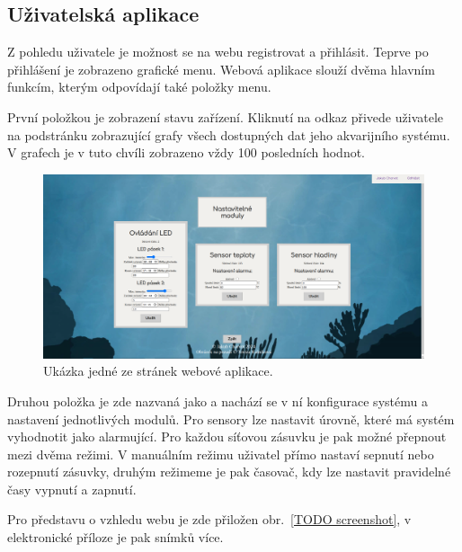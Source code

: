     \subsection{Uživatelská aplikace}
        Z pohledu uživatele je možnost se na webu registrovat a přihlásit. Teprve po přihlášení je zobrazeno grafické menu. Webová aplikace slouží dvěma hlavním funkcím, kterým odpovídají také položky menu. 
        
        První položkou je zobrazení stavu zařízení. Kliknutí na odkaz přivede uživatele na podstránku zobrazující grafy všech dostupných dat jeho akvarijního systému. V grafech je v tuto chvíli zobrazeno vždy 100 posledních hodnot. 

        \begin{figure}[h!]
            \centering
            \includegraphics[width=\textwidth]{obrazky/web.png}
            \caption{Ukázka jedné ze stránek webové aplikace.}
            \label{fig:obrazky-web.png}
        \end{figure}
        

        Druhou položka je zde nazvaná jako  a nachází se v ní konfigurace systému a nastavení jednotlivých modulů. Pro sensory lze nastavit úrovně, které má systém vyhodnotit jako alarmující. Pro každou síťovou zásuvku je pak možné přepnout mezi dvěma režimi. V manuálním režimu uživatel přímo nastaví sepnutí nebo rozepnutí zásuvky, druhým režimeme je pak časovač, kdy lze nastavit pravidelné časy vypnutí a zapnutí.

        Pro představu o vzhledu webu je zde přiložen obr.~\ref{TODO screenshot}, v elektronické příloze je pak snímků více.